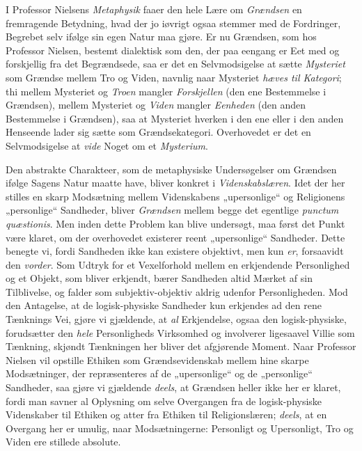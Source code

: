 \documentclass[12pt,a4paper]{book}
\newcommand{\opage}[1]{\marginnote{\footnotesize\textit{[#1]}}}
\begin{document}
I Professor Nielsens \emph{Metaphysik} faaer den hele
Lære om \emph{Grændsen} en fremragende Betydning, hvad
der jo iøvrigt ogsaa stemmer med de Fordringer, Begrebet
selv ifølge sin egen Natur maa gjøre. Er nu Grændsen, som
hos Professor Nielsen, bestemt dialektisk som den, der
paa eengang er Eet med og forskjellig fra det Begrændsede,
saa er det en Selvmodsigelse at sætte \emph{Mysteriet}
som Grændse mellem Tro og Viden, navnlig naar Mysteriet
\emph{hæves til Kategori}; thi mellem Mysteriet og
\emph{Troen} mangler \emph{Forskjellen} (den ene Bestemmelse i
Grændsen), mellem Mysteriet og \emph{Viden} mangler \emph{Eenheden}
(den anden Bestemmelse i Grændsen), saa at
Mysteriet hverken i den ene eller i den anden Henseende lader
sig sætte som Grændsekategori. Overhovedet er det en
Selvmodsigelse at \emph{vide} Noget om et \emph{Mysterium}.

Den abstrakte Charakteer, som de metaphysiske Undersøgelser
om Grændsen ifølge Sagens Natur maatte
have, bliver konkret i \emph{Videnskabslæren}. Idet der her
stilles en skarp Modsætning mellem Videnskabens „upersonlige“
og Religionens „personlige“ Sandheder, bliver
\emph{Grændsen} mellem begge det egentlige \textit{punctum quæstionis}.
Men inden dette Problem kan blive undersøgt, maa først
det Punkt være klaret, om der overhovedet existerer reent
\opage{7}\setcounter{footnote}{0}%
„upersonlige“ Sandheder. Dette benegte vi, fordi Sandheden
ikke kan existere objektivt, men kun \emph{er}, forsaavidt
den \emph{vorder}. Som Udtryk for et Vexelforhold mellem
en erkjendende Personlighed og et Objekt, som bliver
erkjendt, bærer Sandheden altid Mærket af sin Tilblivelse,
og falder som subjektiv-objektiv aldrig udenfor
Personligheden. Mod den Antagelse, at de logisk-physiske
Sandheder kun erkjendes ad den rene Tænknings
Vei, gjøre vi gjældende, at \emph{al} Erkjendelse, ogsaa den
logisk-physiske, forudsætter den \emph{hele} Personligheds Virksomhed
og involverer ligesaavel Villie som Tænkning,
skjøndt Tænkningen her bliver det afgjørende Moment.
Naar Professor Nielsen vil opstille Ethiken som Grændsevidenskab
mellem hine skarpe Modsætninger, der repræsenteres
af de „upersonlige“ og de „personlige“ Sandheder,
saa gjøre vi gjældende \emph{deels}, at Grændsen heller
ikke her er klaret, fordi man savner al Oplysning om
selve Overgangen fra de logisk-physiske Videnskaber til
Ethiken og atter fra Ethiken til Religionslæren; \emph{deels},
at en Overgang her er umulig, naar Modsætningerne:
Personligt og Upersonligt, Tro og Viden ere stillede absolute.
\end{document}
